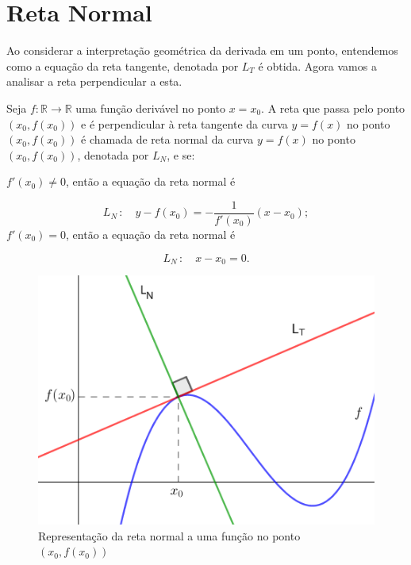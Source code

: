 \cleardoublepage\documentclass[../main.tex]{subfiles}
\begin{document}
\section{Reta Normal}
Ao considerar a interpretação geométrica da derivada em um ponto, entendemos como a equação da reta tangente, denotada por \(L_T\) é obtida. Agora vamos a analisar a reta perpendicular a esta.
\begin{framed}
\begin{definition}
Seja \(f: \mathbb{R} \to \mathbb{R}\) uma função derivável no ponto \(x=x_0\). A reta que passa pelo ponto \((x_0,f(x_0))\) e é perpendicular à reta tangente da curva \(y=f(x)\) no ponto \((x_0,f(x_0))\) é chamada de reta normal da curva \(y=f(x)\) no ponto \((x_0,f(x_0))\), denotada por \(L_N\), e se:

\(f'(x_0)\neq 0\), então a equação da reta normal é

\[ L_N\,:\quad y-f(x_0)=-\dfrac{1}{f'(x_0)}(x-x_0); \]
\(f'(x_0)= 0\), então a equação da reta normal é

\[ L_N\,:\quad x-x_0=0. \]
\end{definition}
\end{framed}
\begin{figure}[htb]
    \centering
    \includegraphics[scale=0.7]{3-cap_derivadas/fig_deriv/RetaTangente-Normal.png}
    \caption{Representação da reta normal a uma função no ponto $(x_0,f(x_0))$}
    \label{fig:RetaTangNormal}
\end{figure}
\end{document}
